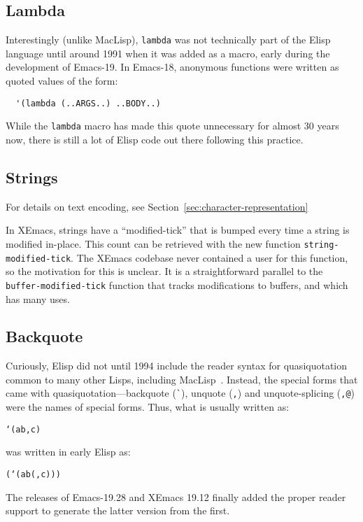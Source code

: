\documentclass[format=acmsmall, review=false, screen=true]{acmart}
\newcommand \Elisp {Elisp}
\begin{document}
\subsection{Lambda}
\label{sec:lambda}

Interestingly (unlike MacLisp), \texttt{lambda} was not technically part of the \Elisp{}
language until around 1991 when it was added as a macro, early during the
development of Emacs-19.  In Emacs-18, anonymous functions were written
as quoted values of the form:
\begin{verbatim}
  '(lambda (..ARGS..) ..BODY..)
\end{verbatim}
While the \texttt{lambda} macro has made this quote unnecessary for almost
30 years now, there is still a lot of \Elisp{} code out there following
this practice.

\subsection{Strings}
\label{sec:strings}


For details on text encoding, see Section~\ref{sec:character-representation}

In XEmacs, strings have a ``modified-tick'' that is bumped every time
a string is modified in-place.  This count can be retrieved with the
new function \texttt{string-modified-tick}.  The XEmacs codebase never
contained a user for this function, so the motivation for this is
unclear.  It is a straightforward parallel to the
\texttt{buffer-modified-tick} function that tracks modifications to
buffers, and which has many uses.


\subsection{Backquote}
\label{sec:backquote}

Curiously, \Elisp{} did not until 1994 include the reader syntax for
quasiquotation common to many other Lisps, including MacLisp~\cite{Bawden1999}.
Instead, the special forms that came with quasiquotation---backquote
(\verb|`|), unquote (\verb|,|) and unquote-splicing (\verb|,@|) were
the names of special forms.   Thus, what is usually written as:
%
\begin{alltt}
`(a b ,c)
\end{alltt}
%
was written in early \Elisp{} as:
%
\begin{alltt}
(` (a b (, c)))
\end{alltt}
%
The releases of Emacs-19.28 and XEmacs 19.12 finally added the proper
reader support to generate the latter version from the first.
\end{document}
